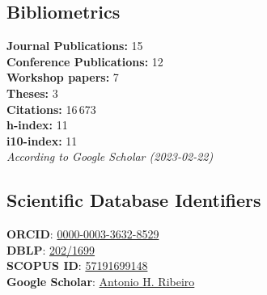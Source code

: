 \documentclass[10pt,letterpaper]{article} %
\begin{document}
\subsection*{Bibliometrics}
\begin{tcolorbox}[standard jigsaw, opacityback=0]
    \vspace{-4pt}
    \begin{multicols}{2}
    \footnotesize

\textbf{Journal Publications:} 15\\
\textbf{Conference Publications:} 12\\
\textbf{Workshop papers:} 7\\
\textbf{Theses:} 3\\

 \noindent
 \textbf{Citations:} 16\,673\\
 \textbf{h-index:} 11\\
 \textbf{i10-index:} 11\\
 \emph{According to Google Scholar (2023-02-22)}
\end{multicols}
\vspace{-20pt}
\end{tcolorbox}

\subsection*{Scientific Database Identifiers}

\begin{tcolorbox}[standard jigsaw, opacityback=0]
    \vspace{-4pt}
    \footnotesize
{\bf ORCID}:  \href{https://orcid.org/0000-0003-3632-8529}{0000-0003-3632-8529}\\
{\bf DBLP}: \href{https://dblp.org/pid/202/1699.html}{202/1699}\\
{\bf SCOPUS ID}: \href{https://www.scopus.com/authid/detail.uri?authorId=57191699148}{57191699148}
  \\
{\bf Google Scholar}: \href{https://scholar.google.com.br/citations?user=5t_sZdMAAAAJ}{Antonio H. Ribeiro}

\end{tcolorbox}



\printmypublications
\end{document}
